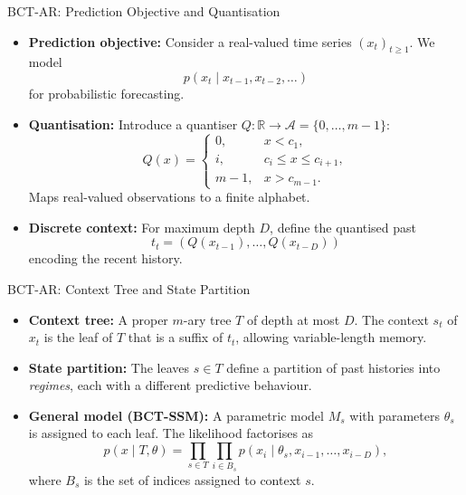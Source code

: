 \documentclass[10pt]{beamer}
\begin{document}
\begin{frame}{BCT-AR: Prediction Objective and Quantisation}
\begin{itemize}
    \item \textbf{Prediction objective:} Consider a real-valued time series $(x_t)_{t\geq 1}$. We model
    \[
    p(x_t \mid x_{t-1}, x_{t-2}, \dots)
    \]
    for probabilistic forecasting.

    \item \textbf{Quantisation:} Introduce a quantiser $Q : \mathbb{R} \to \mathcal{A} = \{0,\dots,m-1\}$:
    \[
    Q(x)=
    \begin{cases}
    0, & x<c_1,\\
    i, & c_i \le x \le c_{i+1},\\
    m-1, & x>c_{m-1}.
    \end{cases}
    \]
    Maps real-valued observations to a finite alphabet.

    \item \textbf{Discrete context:} For maximum depth $D$, define the quantised past
    \[
    t_t = (Q(x_{t-1}), \dots, Q(x_{t-D}))
    \]
    encoding the recent history.
\end{itemize}
\end{frame}

\begin{frame}{BCT-AR: Context Tree and State Partition}
\begin{itemize}
    \item \textbf{Context tree:} A proper $m$-ary tree $T$ of depth at most $D$. The context $s_t$ of $x_t$ is the leaf of $T$ that is a suffix of $t_t$, allowing variable-length memory.

    \item \textbf{State partition:} The leaves $s \in T$ define a partition of past histories into \emph{regimes}, each with a different predictive behaviour.

    \item \textbf{General model (BCT-SSM):} A parametric model $M_s$ with parameters $\theta_s$ is assigned to each leaf. The likelihood factorises as
    \[
    p(x \mid T,\theta)
    =
    \prod_{s\in T} \prod_{i\in B_s}
    p(x_i \mid \theta_s, x_{i-1},\dots,x_{i-D}),
    \]
    where $B_s$ is the set of indices assigned to context $s$.
\end{itemize}
\end{frame}
\end{document}
